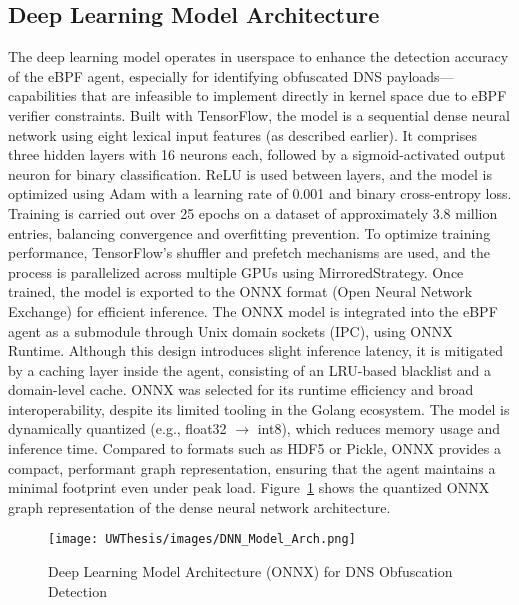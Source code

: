 \documentclass [11pt, proquest] {uwthesis}[2020/02/24]
\begin{document}
\subsection{Deep Learning Model Architecture}
\label{sec:model}
The deep learning model operates in userspace to enhance the detection accuracy of the eBPF agent, especially for identifying obfuscated DNS payloads—capabilities that are infeasible to implement directly in kernel space due to eBPF verifier constraints.
Built with TensorFlow, the model is a sequential dense neural network using eight lexical input features (as described earlier). It comprises three hidden layers with 16 neurons each, followed by a sigmoid-activated output neuron for binary classification. ReLU is used between layers, and the model is optimized using Adam with a learning rate of 0.001 and binary cross-entropy loss. Training is carried out over 25 epochs on a dataset of approximately 3.8 million entries, balancing convergence and overfitting prevention.
To optimize training performance, TensorFlow’s shuffler and prefetch mechanisms are used, and the process is parallelized across multiple GPUs using MirroredStrategy. Once trained, the model is exported to the ONNX format (Open Neural Network Exchange) for efficient inference. The ONNX model is integrated into the eBPF agent as a submodule through Unix domain sockets (IPC), using ONNX Runtime. Although this design introduces slight inference latency, it is mitigated by a caching layer inside the agent, consisting of an LRU-based blacklist and a domain-level cache. ONNX was selected for its runtime efficiency and broad interoperability, despite its limited tooling in the Golang ecosystem. The model is dynamically quantized (e.g., float32 $\rightarrow$ int8), which reduces memory usage and inference time. Compared to formats such as HDF5 or Pickle, ONNX provides a compact, performant graph representation, ensuring that the agent maintains a minimal footprint even under peak load. Figure~\ref{sec:model_arch} shows the quantized ONNX graph representation of the dense neural network architecture.



\begin{figure}[htbp]
\texttt{[image: UWThesis/images/DNN\_Model\_Arch.png]}
\caption{Deep Learning Model Architecture (ONNX) for DNS Obfuscation Detection}
\label{sec:model_arch}
\end{figure}
\end{document}
